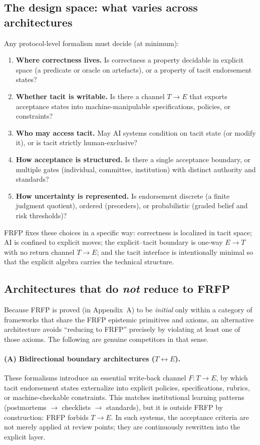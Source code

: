 \subsection{The design space: what varies across architectures}

Any protocol-level formalism must decide (at minimum):
\begin{enumerate}[leftmargin=2em]
  \item \textbf{Where correctness lives.} Is correctness a property decidable in explicit space (a predicate or oracle on artefacts), or a property of tacit endorsement states?
  \item \textbf{Whether tacit is writable.} Is there a channel \(T\to E\) that exports acceptance states into machine-manipulable specifications, policies, or constraints?
  \item \textbf{Who may access tacit.} May AI systems condition on tacit state (or modify it), or is tacit strictly human-exclusive?
  \item \textbf{How acceptance is structured.} Is there a single acceptance boundary, or multiple gates (individual, committee, institution) with distinct authority and standards?
  \item \textbf{How uncertainty is represented.} Is endorsement discrete (a finite judgment quotient), ordered (preorders), or probabilistic (graded belief and risk thresholds)?
\end{enumerate}
FRFP fixes these choices in a specific way: correctness is localized in tacit space; AI is confined to
explicit moves; the explicit--tacit boundary is one-way \(E\to T\) with no return channel \(T\to E\);
and the tacit interface is intentionally minimal so that the explicit algebra carries the technical
structure.

\subsection{Architectures that do \emph{not} reduce to FRFP}

Because FRFP is proved (in Appendix~A) to be \emph{initial} only within a category of frameworks that
share the FRFP epistemic primitives and axioms, an alternative architecture avoids ``reducing to
FRFP'' precisely by violating at least one of those axioms. The following are genuine competitors in
that sense.

\paragraph{(A) Bidirectional boundary architectures (\(T\leftrightarrow E\)).}
These formalisms introduce an essential write-back channel \(F:T\to E\), by which tacit endorsement
states externalize into explicit policies, specifications, rubrics, or machine-checkable constraints.
This matches institutional learning patterns (postmortems \(\to\) checklists \(\to\) standards), but it
is outside FRFP by construction: FRFP forbids \(T\to E\). In such systems, the acceptance criteria are
not merely applied at review points; they are continuously rewritten into the explicit layer.

